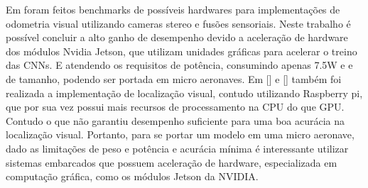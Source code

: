 Em \cite{jeon2021run} foram feitos benchmarks de possíveis hardwares para implementações de odometria visual utilizando cameras stereo e fusões sensoriais. Neste trabalho é possível concluir a alto ganho de desempenho devido a aceleração de hardware dos módulos Nvidia Jetson, que utilizam unidades gráficas para acelerar o treino das CNNs. E atendendo os requisitos de potência, consumindo apenas 7.5W e e de tamanho, podendo ser portada em micro aeronaves.  Em [] e [] também foi realizada a implementação de localização visual, contudo utilizando Raspberry pi, que por sua vez possui mais recursos de processamento na CPU do que GPU. Contudo  o que não garantiu desempenho suficiente para uma boa acurácia na localização visual. Portanto, para se portar um modelo em uma micro aeronave, dado as limitações de peso e potência e acurácia mínima é interessante utilizar sistemas embarcados que possuem aceleração de hardware, especializada em computação gráfica, como os módulos Jetson da NVIDIA.